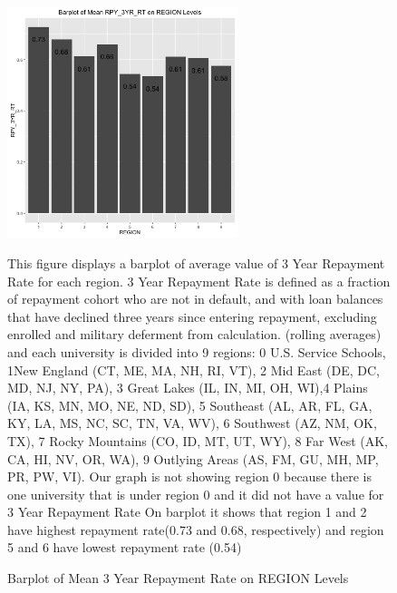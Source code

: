 \documentclass[a4paper]{article}\usepackage[]{graphicx}\usepackage[]{color}
\begin{document}
\begin{figure}
  \caption{Barplot of Mean 3 Year Repayment Rate on REGION Levels}
  \centering
  \includegraphics[width=0.6\textwidth]{../images/eda/rpy_region_barplot.png}
  \centering
  \newline
  
  \raggedright
This figure displays a barplot of average value of 3 Year Repayment Rate for each region. 3 Year Repayment Rate is defined as a fraction of repayment cohort who are not in default, and with loan balances that have declined three years since entering repayment, excluding enrolled and military deferment from calculation. (rolling averages) and each university is divided into 9 regions: 0	U.S. Service Schools, 1New England (CT, ME, MA, NH, RI, VT), 2	Mid East (DE, DC, MD, NJ, NY, PA), 3	Great Lakes (IL, IN, MI, OH, WI),4	Plains (IA, KS, MN, MO, NE, ND, SD), 5	Southeast (AL, AR, FL, GA, KY, LA, MS, NC, SC, TN, VA, WV), 6	Southwest (AZ, NM, OK, TX), 7	Rocky Mountains (CO, ID, MT, UT, WY), 8	Far West (AK, CA, HI, NV, OR, WA), 9	Outlying Areas (AS, FM, GU, MH, MP, PR, PW, VI). Our graph is not showing region 0 because there is one university that is under region 0 and it did not have a value for 3 Year Repayment Rate On barplot it shows that region 1 and 2 have highest repayment rate(0.73 and 0.68, respectively) and region 5 and 6 have lowest repayment rate (0.54)
\end{figure}
\end{document}
